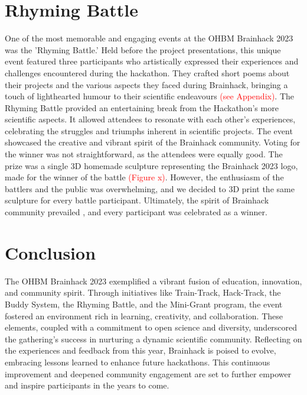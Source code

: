 \documentclass{article}
\begin{document}
\section{Rhyming Battle}

One of the most memorable and engaging events at the OHBM Brainhack 2023 was the 'Rhyming Battle.'
Held before the project presentations, this unique event featured three participants who artistically expressed their experiences and challenges encountered during the hackathon.
They crafted short poems about their projects and the various aspects they faced during Brainhack, bringing a touch of lighthearted humour to their scientific endeavours \textcolor{red}{(see Appendix)}.
The Rhyming Battle provided an entertaining break from the Hackathon's more scientific aspects.
It allowed attendees to resonate with each other's experiences, celebrating the struggles and triumphs inherent in scientific projects.
The event showcased the creative and vibrant spirit of the Brainhack community.
Voting for the winner was not straightforward, as the attendees were equally good.
The prize was a single 3D homemade sculpture representing the Brainhack 2023 logo, made for the winner of the battle \textcolor{red}{(Figure x)}.
However, the enthusiasm of the battlers and the public was overwhelming, and we decided to 3D print the same sculpture for every battle participant.
Ultimately, the spirit of Brainhack community prevailed \cite{gau2021brainhack,levitis2021centering}, and every participant was celebrated as a winner.

\section{Conclusion}

The OHBM Brainhack 2023 exemplified a vibrant fusion of education, innovation, and community spirit.
Through initiatives like Train-Track, Hack-Track, the Buddy System, the Rhyming Battle, and the Mini-Grant program, the event fostered an environment rich in learning, creativity, and collaboration.
These elements, coupled with a commitment to open science and diversity, underscored the gathering's success in nurturing a dynamic scientific community.
Reflecting on the experiences and feedback from this year, Brainhack is poised to evolve, embracing lessons learned to enhance future hackathons.
This continuous improvement and deepened community engagement are set to further empower and inspire participants in the years to come.



\end{document}

